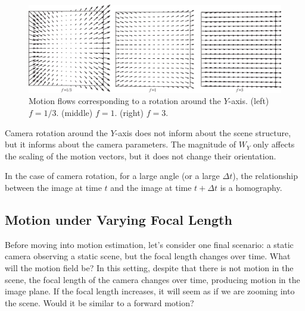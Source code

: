 \begin{figure}[h!]
\centerline{
\includegraphics[width=1\linewidth]{figures/optical_flow/camera_motion_field_rotation_three_f.eps}
} 
\caption{Motion flows corresponding to a rotation around the 
$Y$-axis. (left) $f = 1/3$. (middle) $f = 1$.
(right) $f = 3$.}
\label{fig:motion_wy_f03_f1_f3}
\end{figure}

Camera rotation around the $Y$-axis does not inform about the scene structure, but it informs about the camera parameters. The magnitude of $W_Y$ only affects the scaling of the motion vectors, but it does not change their orientation. 

In the case of camera rotation, for a large angle (or a large $\Delta t$), the relationship between the image at time $t$ and the image at time $t+\Delta t$ is a homography. 






\subsection{Motion under Varying Focal Length}

Before moving into motion estimation, let's consider one final scenario: a static camera observing a static scene, but the focal length changes over time. What will the motion field be?  In this setting, despite that there is not motion in the scene, the focal length of the camera changes over time, producing motion in the image plane. If the focal length increases, it will seem as if we are zooming into the scene. Would it be similar to a forward motion?

